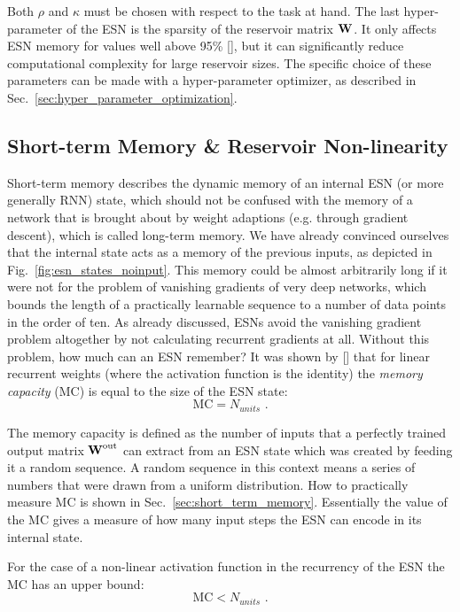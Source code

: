 Both $\rho$ and $\kappa$ must be chosen with respect to the task at hand.  The
last hyper-parameter of the ESN is the sparsity of the reservoir matrix
$\boldsymbol{\textbf{W}}^{\text{}}$. It only affects ESN memory for values well above 95\%
[\cite{farkavs2016}], but it can significantly reduce computational complexity
for large reservoir sizes.  The specific choice of these parameters can be made
with a hyper-parameter optimizer, as described in
Sec.~\ref{sec:hyper_parameter_optimization}.


\subsection{Short-term Memory \& Reservoir Non-linearity}%
\label{sub:short_term_memory}

Short-term memory describes the dynamic memory of an internal ESN (or more
generally RNN) state, which should not be confused with the memory of a network
that is brought about by weight adaptions (e.g. through gradient descent),
which is called long-term memory.  We have already convinced ourselves that the
internal state acts as a memory of the previous inputs, as depicted in
Fig.~\ref{fig:esn_states_noinput}.  This memory could be almost arbitrarily
long if it were not for the problem of vanishing gradients of very deep
networks, which bounds the length of a practically learnable sequence to a
number of data points in the order of ten.  As already discussed, ESNs avoid
the vanishing gradient problem altogether by not calculating recurrent
gradients at all. Without this problem, how much can an ESN remember?  It was
shown by [\cite{jaeger2002}] that for linear recurrent weights (where the
activation function is the identity) the \emph{memory capacity} (MC) is equal
to the size of the ESN state:
\begin{equation}
  \text{MC} = N_{units} \text{ .}
\end{equation}

The memory capacity is defined as the number of inputs that a perfectly trained
output matrix $\boldsymbol{\textbf{W}}^{\text{out}}$ can extract from an ESN state which was created by
feeding it a random sequence.  A random sequence in this context means a series
of numbers that were drawn from a uniform distribution. How to practically measure
MC is shown in Sec.~\ref{sec:short_term_memory}. Essentially the value of the MC
gives a measure of how many input steps the ESN can encode in its internal state.

For the case of a non-linear activation function in the recurrency of the ESN
the MC has an upper bound:
\begin{equation}
  \text{MC} < N_{units} \text{ .}
\end{equation}

